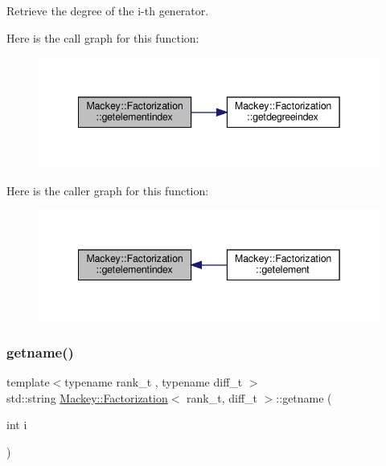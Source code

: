 Retrieve the degree of the i-\/th generator. 

Here is the call graph for this function\+:\nopagebreak
\begin{figure}[H]
\begin{center}
\leavevmode
\includegraphics[width=342pt]{classMackey_1_1Factorization_a5217ad8ca4aaa13b900adda77893249b_cgraph}
\end{center}
\end{figure}
Here is the caller graph for this function\+:\nopagebreak
\begin{figure}[H]
\begin{center}
\leavevmode
\includegraphics[width=342pt]{classMackey_1_1Factorization_a5217ad8ca4aaa13b900adda77893249b_icgraph}
\end{center}
\end{figure}
\mbox{\label{classMackey_1_1Factorization_ac5088227511baaaec1f62802b75d3a9e}} 
\subsubsection{\texorpdfstring{getname()}{getname()}}
{\footnotesize\ttfamily template$<$typename rank\+\_\+t , typename diff\+\_\+t $>$ \\
std\+::string \hyperlink{classMackey_1_1Factorization}{Mackey\+::\+Factorization}$<$ rank\+\_\+t, diff\+\_\+t $>$\+::getname (\begin{DoxyParamCaption}\item[{int}]{i }\end{DoxyParamCaption})}



